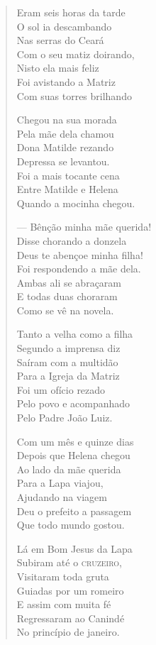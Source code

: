 \begin{verse}
Eram seis horas da tarde \\
O sol ia descambando \\
Nas serras do Ceará \\
Com o seu matiz doirando, \\
Nisto ela mais feliz \\
Foi avistando a Matriz \\
Com suas torres brilhando 
\pagebreak

Chegou na sua morada \\
Pela mãe dela chamou \\
Dona Matilde rezando \\
Depressa se levantou. \\
Foi a mais tocante cena \\
Entre Matilde e Helena \\
Quando a mocinha chegou. 

--- Bênção minha mãe querida! \\
Disse chorando a donzela \\
Deus te abençoe minha filha! \\
Foi respondendo a mãe dela. \\
Ambas ali se abraçaram \\
E todas duas choraram \\
Como se vê na novela. 

Tanto a velha como a filha \\
Segundo a imprensa diz \\
Saíram com a multidão \\
Para a Igreja da Matriz \\
Foi um ofício rezado \\
Pelo povo e acompanhado \\
Pelo Padre João Luiz. 

Com um mês e quinze dias \\
Depois que Helena chegou \\
Ao lado da mãe querida \\
Para a Lapa viajou, \\
Ajudando na viagem \\
Deu o prefeito a passagem \\
Que todo mundo gostou. 
\pagebreak

Lá em Bom Jesus da Lapa \\
Subiram até o \textsc{cruzeiro}, \\
Visitaram toda gruta \\
Guiadas por um romeiro \\
E assim com muita fé \\
Regressaram ao Canindé \\
No princípio de janeiro. 


\end{verse}
